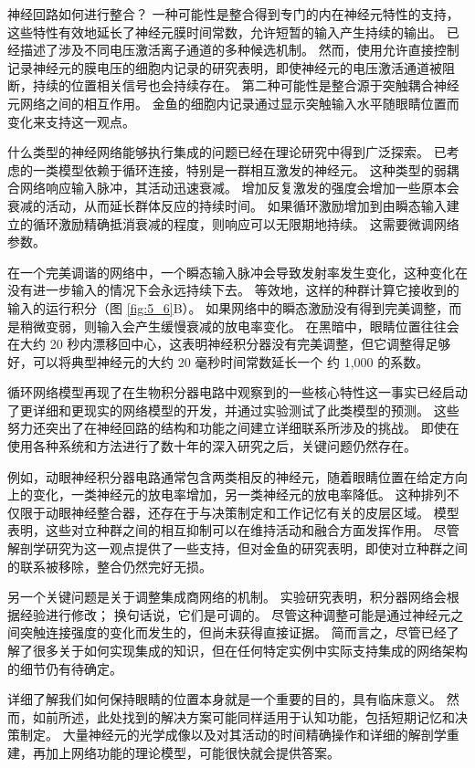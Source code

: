 神经回路如何进行整合？ 
一种可能性是整合得到专门的内在神经元特性的支持，这些特性有效地延长了神经元膜时间常数，允许短暂的输入产生持续的输出。
已经描述了涉及不同电压激活离子通道的多种候选机制。 
然而，使用允许直接控制记录神经元的膜电压的细胞内记录的研究表明，即使神经元的电压激活通道被阻断，持续的位置相关信号也会持续存在。 
第二种可能性是整合源于突触耦合神经元网络之间的相互作用。 
金鱼的细胞内记录通过显示突触输入水平随眼睛位置而变化来支持这一观点。


什么类型的神经网络能够执行集成的问题已经在理论研究中得到广泛探索。 
已考虑的一类模型依赖于循环连接，特别是一群相互激发的神经元。 
这种类型的弱耦合网络响应输入脉冲，其活动迅速衰减。 
增加反复激发的强度会增加一些原本会衰减的活动，从而延长群体反应的持续时间。
如果循环激励增加到由瞬态输入建立的循环激励精确抵消衰减的程度，则响应可以无限期地持续。 这需要微调网络参数。


在一个完美调谐的网络中，一个瞬态输入脉冲会导致发射率发生变化，这种变化在没有进一步输入的情况下会永远持续下去。 
等效地，这样的种群计算它接收到的输入的运行积分（图 \ref{fig:5_6}B）。 
如果网络中的瞬态激励没有得到完美调整，而是稍微变弱，则输入会产生缓慢衰减的放电率变化。 
在黑暗中，眼睛位置往往会在大约 20 秒内漂移回中心，这表明神经积分器没有完美调整，但它调整得足够好，可以将典型神经元的大约 20 毫秒时间常数延长一个 约 1,000 的系数。


循环网络模型再现了在生物积分器电路中观察到的一些核心特性这一事实已经启动了更详细和更现实的网络模型的开发，并通过实验测试了此类模型的预测。 
这些努力还突出了在神经回路的结构和功能之间建立详细联系所涉及的挑战。 
即使在使用各种系统和方法进行了数十年的深入研究之后，关键问题仍然存在。


例如，动眼神经积分器电路通常包含两类相反的神经元，随着眼睛位置在给定方向上的变化，一类神经元的放电率增加，另一类神经元的放电率降低。 
这种排列不仅限于动眼神经整合器，还存在于与决策制定和工作记忆有关的皮层区域。
模型表明，这些对立种群之间的相互抑制可以在维持活动和融合方面发挥作用。 
尽管解剖学研究为这一观点提供了一些支持，但对金鱼的研究表明，即使对立种群之间的联系被移除，整合仍然完好无损。


另一个关键问题是关于调整集成商网络的机制。 
实验研究表明，积分器网络会根据经验进行修改； 换句话说，它们是可调的。 
尽管这种调整可能是通过神经元之间突触连接强度的变化而发生的，但尚未获得直接证据。 
简而言之，尽管已经了解了很多关于如何实现集成的知识，但在任何特定实例中实际支持集成的网络架构的细节仍有待确定。


详细了解我们如何保持眼睛的位置本身就是一个重要的目的，具有临床意义。 
然而，如前所述，此处找到的解决方案可能同样适用于认知功能，包括短期记忆和决策制定。
大量神经元的光学成像以及对其活动的时间精确操作和详细的解剖学重建，再加上网络功能的理论模型，可能很快就会提供答案。



